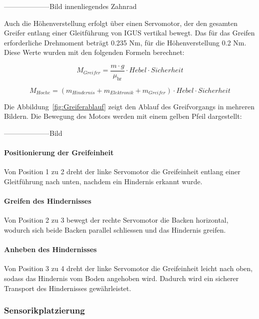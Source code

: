 \documentclass[main.tex]{subfiles} %
\begin{document}
--------------------Bild innenliegendes Zahnrad

Auch die Höhenverstellung erfolgt
über einen Servomotor, der den gesamten Greifer entlang einer Gleitführung von IGUS vertikal bewegt.
Das für das Greifen erforderliche Drehmoment beträgt 0.235 $ \text{Nm}$,
für die Höhenverstellung 0.2 $\text{Nm}$. Diese Werte wurden mit den folgenden Formeln berechnet:

\[
    M_{Greifer} = \frac{m \cdot g}{\mu_{\text{hr}}} \cdot Hebel \cdot Sicherheit
\]

\[
    M_{Hoehe} = (m_{Hindernis} + m_{Elektronik} + m_{Greifer}) \cdot Hebel \cdot Sicherheit
\]

\newpage

Die Abbildung~\ref{fig:Greiferablauf} zeigt den Ablauf des Greifvorgangs in mehreren Bildern.
Die Bewegung des Motors werden mit einem gelben Pfeil dargestellt:

--------------------Bild

\paragraph{Positionierung der Greifeinheit}
Von Position 1 zu 2 dreht der linke Servomotor die Greifeinheit entlang einer Gleitführung
nach unten, nachdem ein Hindernis erkannt wurde.

\paragraph{Greifen des Hindernisses}

Von Position 2 zu 3 bewegt der rechte Servomotor die Backen horizontal, wodurch sich
beide Backen parallel schliessen und das Hindernis greifen.

\paragraph{Anheben des Hindernisses}

Von Position 3 zu 4 dreht der linke Servomotor die Greifeinheit leicht nach oben, sodass
das Hindernis vom Boden angehoben wird. Dadurch wird ein sicherer Transport des Hindernisses gewährleistet.



\newpage

\subsubsection{Sensorikplatzierung}
\end{document}
